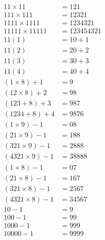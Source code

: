 \begin{align*}
11\times 11 &= 121 \\ %
111 \times 111 &= 12321\\
1111 \times 1111 &= 1234321 \\
11111 \times 11111 &= 123454321\\[0.4cm]
11(1) &= 10+1\\ %
11(2) &= 20+2\\
11(3) &= 30+3\\
11(4) &= 40+4\\[0.4cm]
(1\times 8) + 1 &= 9\\ %
(12 \times 8) +2 &=98 \\
(123 + 8)+3 &=987\\
(1234 + 8)+4 &=9876\\[0.4cm]
(1\times 9) - 1 &= 08\\ %
(21 \times 9) - 1 &= 188\\
(321 \times 9) - 1 &= 2888\\
(4321 \times 9)-1 &= 38888\\[0.4cm]
(1 \times 8) - 1 &= 07\\ %
(21\times 8) - 1 &= 167\\
(321 \times 8)-1 &= 2567\\
(4321 \times 8) -1 &=34567\\[0.4cm]
10-1 &= 9\\ %
100-1 &= 99\\
1000-1 &= 999\\
10000 - 1 &= 9999
\end{align*}
